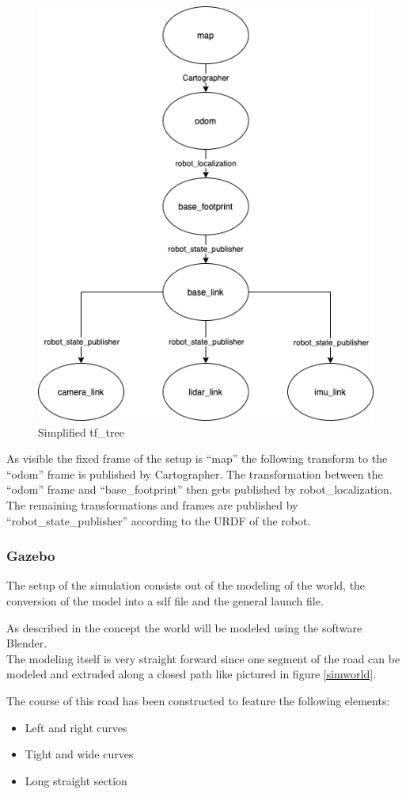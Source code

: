 \begin{figure}[H]
	\centering
	\includegraphics[width=.5\textwidth]{Pictures/tf tree simplified}
	\caption{Simplified tf\_tree}
	\label{tfsimp}
\end{figure}

As visible the fixed frame of the setup is ``map'' the following transform to the ``odom'' frame is published by Cartographer. The transformation between the ``odom'' frame and ``base\_footprint'' then gets published by robot\_localization.\\
The remaining transformations and frames are published by ``robot\_state\_publisher'' according to the URDF of the robot.

\subsubsection{Gazebo}
The setup of the simulation consists out of the modeling of the world, the conversion of the model into a sdf file and the general launch file.

As described in the concept the world will be modeled using the software Blender.\\

The modeling itself is very straight forward since one segment of the road can be modeled and extruded along a closed path like pictured in figure \ref{simworld}. 

The course of this road has been constructed to feature the following elements:

\begin{itemize}
	\item Left and right curves
	\item Tight and wide curves
	\item Long straight section
\end{itemize}

